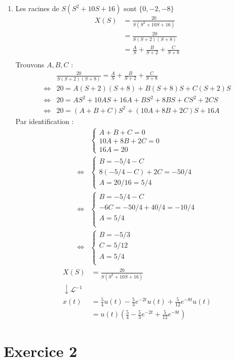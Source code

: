 \documentclass{article}
\theoremstyle{plain}%
\theoremstyle{definition}
\theoremstyle{remark}
\begin{document}
\begin{enumerate}
    \item Les racines de $ S(S^2 + 10S + 16) $ sont $ \{0, -2, -8\} $ 
    \begin{align*}
        X(S) &= \frac{20}{S(S^2 + 10S + 16)} \\
            &= \frac{20}{S(S+2)(S+8)} \\
            &= \frac{A}{S} + \frac{B}{S+2} + \frac{C}{S+8} \\
    \end{align*}
    Trouvons $ A, B, C $ : 
    \begin{align*}
        &\frac{20}{S(S+2)(S+8)} = \frac{A}{S} + \frac{B}{S+2} + \frac{C}{S+8} \\
        \Leftrightarrow & 20 = A(S+2)(S+8) + B(S+8)S + C(S+2)S \\ 
        \Leftrightarrow & 20 = AS^2 + 10AS + 16A + BS^2 + 8BS + CS^2 + 2CS \\
        \Leftrightarrow & 20 = (A + B + C)S^2 + (10A + 8B + 2C)S + 16A
    \end{align*}
    Par identification : 
    \begin{align*}
        &\begin{cases}
            A + B + C = 0 \\
            10A + 8B + 2C = 0 \\
            16A = 20
        \end{cases} \\
        \Leftrightarrow &
        \begin{cases}
            B = -5/4 - C \\
            8(-5/4 - C) + 2C = -50/4 \\
            A = 20/16 = 5/4
        \end{cases} \\
        \Leftrightarrow &
        \begin{cases}
            B = -5/4 - C \\
            -6C = -50/4 + 40/4 = -10/4 \\
            A = 5/4 \\
        \end{cases} \\
        \Leftrightarrow &
        \begin{cases}
            B = -5/3 \\
            C = 5/12 \\
            A = 5/4 \\
        \end{cases}
    \end{align*}
    \begin{align*}
        X(S) &= \frac{20}{S(S^2 + 10S + 16)}\\
        \downarrow \mathcal{L}^{-1}& \\
        x(t) &= \frac{5}{4}u(t) - \frac{5}{3}e^{-2t}u(t) + \frac{5}{12}e^{-8t}u(t) \\
            &= u(t)(\frac{5}{4} - \frac{5}{3}e^{-2t} + \frac{5}{12}e^{-8t})
    \end{align*}
\end{enumerate}

\section{Exercice 2}
\end{document}
